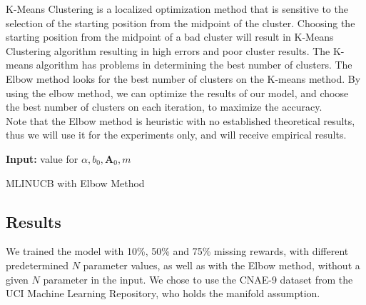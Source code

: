 \documentclass{article}
\begin{document}
K-Means Clustering is a localized optimization method that is sensitive to the selection of the starting position from the midpoint of the cluster. Choosing the starting position from the midpoint of a bad cluster will result in K-Means Clustering algorithm resulting in high errors and poor cluster results. The K-means algorithm has problems in determining the best number of clusters. The Elbow method looks for the best number of clusters on the K-means method. By using the elbow method, we can optimize the results of our model, and choose the best number of clusters on each iteration, to maximize the accuracy.\\
Note that the Elbow method is heuristic with no established theoretical results, thus we will use it for the experiments only, and will receive empirical results.\\


\begin{algorithm}[H]
\SetAlgoLined
 \textbf{Input:} value for $\alpha, b_0, \textbf{A}_0, m$ \\
    
 \caption{MLINUCB with Elbow Method}
\end{algorithm}

\subsection{Results}

We trained the model with 10\%, 50\% and 75\% missing rewards, with different predetermined $N$ parameter values, as well as with the Elbow method, without a given $N$ parameter in the input. We chose to use the CNAE-9 dataset from the UCI Machine Learning Repository, who holds the manifold assumption.\\
\end{document}
